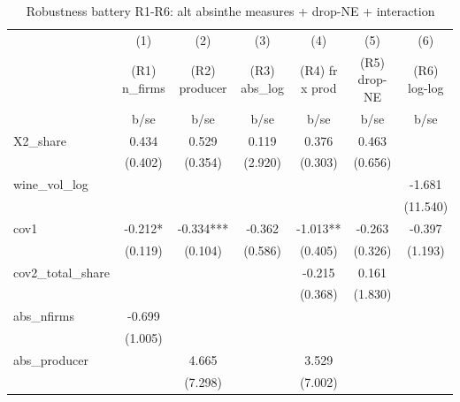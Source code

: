 \begin{table}[htbp]\centering
\def\sym#1{\ifmmode^{#1}\else\(^{#1}\)\fi}
\caption{Robustness battery R1-R6: alt absinthe measures + drop-NE + interaction \label{tab:r1r6}}
\begin{tabular}{l*{6}{c}}
\toprule
            &\multicolumn{1}{c}{(1)}&\multicolumn{1}{c}{(2)}&\multicolumn{1}{c}{(3)}&\multicolumn{1}{c}{(4)}&\multicolumn{1}{c}{(5)}&\multicolumn{1}{c}{(6)}\\
            &\multicolumn{1}{c}{(R1) n\_firms}&\multicolumn{1}{c}{(R2) producer}&\multicolumn{1}{c}{(R3) abs\_log}&\multicolumn{1}{c}{(R4) fr x prod}&\multicolumn{1}{c}{(R5) drop-NE}&\multicolumn{1}{c}{(R6) log-log}\\
            &        b/se   &        b/se   &        b/se   &        b/se   &        b/se   &        b/se   \\
\midrule
X2\_share    &       0.434   &       0.529   &       0.119   &       0.376   &       0.463   &               \\
            &     (0.402)   &     (0.354)   &     (2.920)   &     (0.303)   &     (0.656)   &               \\
wine\_vol\_log&               &               &               &               &               &      -1.681   \\
            &               &               &               &               &               &    (11.540)   \\
cov1        &      -0.212*  &      -0.334***&      -0.362   &      -1.013** &      -0.263   &      -0.397   \\
            &     (0.119)   &     (0.104)   &     (0.586)   &     (0.405)   &     (0.326)   &     (1.193)   \\
cov2\_total\_share&               &               &               &      -0.215   &       0.161   &               \\
            &               &               &               &     (0.368)   &     (1.830)   &               \\
abs\_nfirms  &      -0.699   &               &               &               &               &               \\
            &     (1.005)   &               &               &               &               &               \\
abs\_producer&               &       4.665   &               &       3.529   &               &               \\
            &               &     (7.298)   &               &     (7.002)   &               &               \\

\end{tabular}
\end{table}
